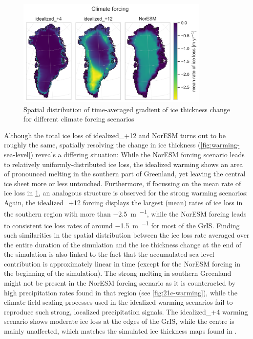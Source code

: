 \begin{figure}
	\centering
	\includegraphics[width=0.85\textwidth]{../global-warming/figs/ice-loss-rate.png}
	\caption{Spatial distribution of time-averaged gradient of ice thickness change for different climate forcing scenarios}
	\label{fig:rate-ice-loss}
\end{figure}

Although the total ice loss of idealized\_+12 and NorESM turns out to be roughly the same, spatially resolving the change in ice thickness (\cref{fig:warming-sea-level}) reveals a differing situation: While the NorESM forcing scenario leads to relatively uniformly-distributed ice loss, the idealized warming shows an area of pronounced melting in the southern part of Greenland, yet leaving the central ice sheet more or less untouched. Furthermore, if focussing on the mean rate of ice loss in \cref{fig:rate-ice-loss}, an analogous structure is observed for the strong warming scenarios: Again, the idealized\_+12 forcing displays the largest (mean) rates of ice loss in the southern region with more than \SI{-2.5}{\m\per\year}, while the NorESM forcing leads to consistent ice loss rates of around \SI{-1.5}{\m\per\year} for most of the GrIS. Finding such similarities in the spatial distribution between the ice loss rate averaged over the entire duration of the simulation and the ice thickness change at the end of the simulation is also linked to the fact that the accumulated sea-level contribution is approximately linear in time (except for the NorESM forcing in the beginning of the simulation). The strong melting in southern Greenland might not be present in the NorESM forcing scenario as it is counteracted by high precipitation rates found in that region (see \cref{fig:21c-warming}), while the climate field scaling processes used in the idealized warming scenarios fail to reproduce such strong, localized precipitation signals. The idealized\_+4 warming scenario shows moderate ice loss at the edges of the GrIS, while the centre is mainly unaffected, which matches the simulated ice thickness maps found in \textcite{greve2022}.
